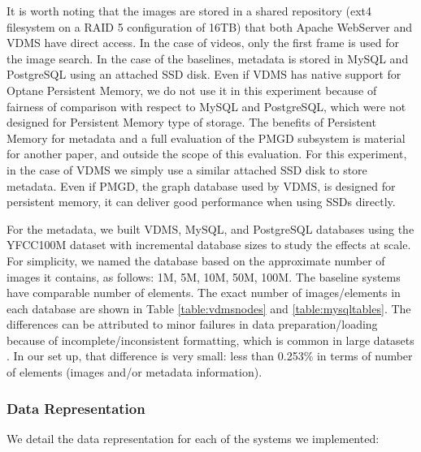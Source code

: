 It is worth noting that the images are stored in a shared repository
(ext4 filesystem on a RAID 5 configuration of 16TB) that both
Apache WebServer and VDMS have direct access.
In the case of videos, only the first frame is used for the image search.
In the case of the baselines, metadata is
stored in MySQL and PostgreSQL using an attached SSD disk.
Even if VDMS has native support for Optane Persistent Memory,
we do not use it in this experiment because of fairness of
comparison with respect to MySQL and PostgreSQL, which were not designed for
Persistent Memory type of storage.
The benefits of Persistent Memory for metadata and a full evaluation of
the PMGD subsystem is material for another paper,
and outside the scope of this evaluation.
For this experiment, in the case of VDMS we simply use a similar
attached SSD disk to store metadata.
Even if PMGD, the graph database used by VDMS, is designed for persistent memory,
it can deliver good performance when using SSDs directly.

For the metadata, we built VDMS, MySQL, and PostgreSQL databases using
the YFCC100M dataset with incremental database sizes to study the effects at scale.
For simplicity, we named the database based on the approximate number of images
it contains, as follows: 1M, 5M, 10M, 50M, 100M.
The baseline systems have comparable number of elements.
The exact number of images/elements in each database are shown in
Table \ref{table:vdmsnodes} and \ref{table:mysqltables}.
The differences can be attributed to minor failures in data
preparation/loading because of incomplete/inconsistent formatting,
which is common in large datasets \cite{failures}.
In our set up, that difference is very small: less than 0.253\% in terms of
number of elements (images and/or metadata information).

\subsubsection{Data Representation}
We detail the data representation for each of the systems we implemented:

